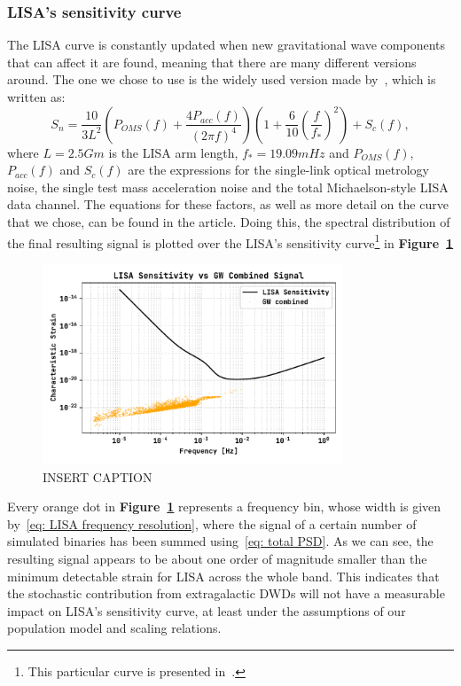 \subsubsection{LISA's sensitivity curve}
The LISA curve is constantly updated when new gravitational wave components that can affect it are found, meaning that there are many different versions around.
The one we chose to use is the widely used version made by~\cite{Robson_2019}, which is written as:
\begin{equation}
    S_n = \frac{10}{3L^2} \left( P_{OMS}(f) + \frac{4P_{acc}(f)}{(2\pi f)^4} \right)\left( 1 + \frac{6}{10}\left(\frac{f}{f_*}\right)^2 \right) + S_c(f),
    \label{eq: LISA sensitivity curve by Robson}
\end{equation}
where $L=2.5 Gm$ is the LISA arm length, $f_*=19.09mHz$ and $P_{OMS}(f)$, $P_{acc}(f)$ and $S_c(f)$ are the expressions for the single-link optical metrology noise, the single test mass acceleration noise and the total Michaelson-style LISA data channel. 
The equations for these factors, as well as more detail on the curve that we chose, can be found in the article.
Doing this, the spectral distribution of the final resulting signal is plotted over the LISA's sensitivity curve\footnote{This particular curve is presented in~\cite{Robson_2019}.} in \textbf{Figure~\ref{fig: Final results plot}}
\begin{figure}[hb!]
    \begin{center}
        \includegraphics[width=0.8\textwidth]{images/Final_results_plot.pdf}
    \end{center}
    \caption{INSERT CAPTION}\label{fig: Final results plot}
\end{figure}
Every orange dot in \textbf{Figure~\ref{fig: Final results plot}} represents a frequency bin, whose width is given by~\eqref{eq: LISA frequency resolution}, where the signal of a certain number of simulated binaries has been summed using~\eqref{eq: total PSD}.
As we can see, the resulting signal appears to be about one order of magnitude smaller than the minimum detectable strain for LISA across the whole band.  
This indicates that the stochastic contribution from extragalactic DWDs will not have a measurable impact on LISA’s sensitivity curve, at least under the assumptions of our population model and scaling relations.

